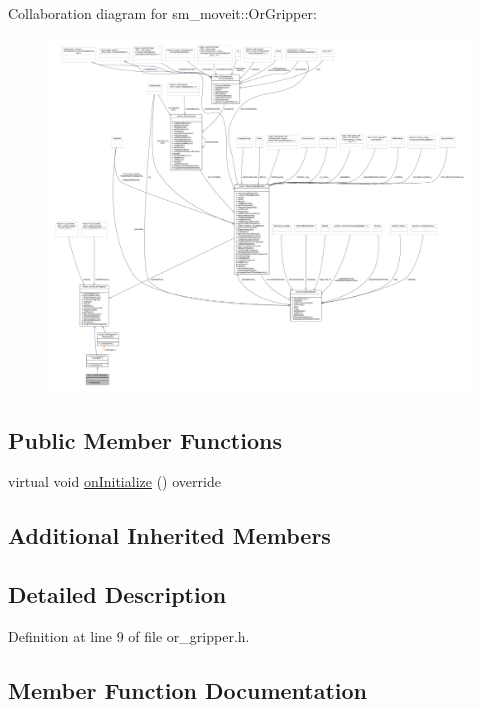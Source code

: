 Collaboration diagram for sm\+\_\+moveit\+:\+:Or\+Gripper\+:
\nopagebreak
\begin{figure}[H]
\begin{center}
\leavevmode
\includegraphics[width=350pt]{classsm__moveit_1_1OrGripper__coll__graph}
\end{center}
\end{figure}
\subsection*{Public Member Functions}
\begin{DoxyCompactItemize}
\item 
virtual void \hyperlink{classsm__moveit_1_1OrGripper_a845a54a1d4469b8aee57c33c49312c86}{on\+Initialize} () override
\end{DoxyCompactItemize}
\subsection*{Additional Inherited Members}


\subsection{Detailed Description}


Definition at line 9 of file or\+\_\+gripper.\+h.



\subsection{Member Function Documentation}
